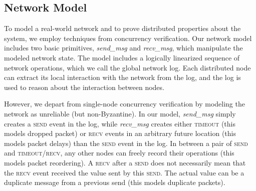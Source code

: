 
\subsection{Network Model}\label{subsec:network_modeling}
To model a real-world network and to prove distributed properties about the system, we employ techniques from concurrency verification. Our network model includes two basic primitives, \textit{send\_msg} and \textit{recv\_msg}, which manipulate the modeled network state. The model includes a logically linearized sequence of network operations, which we call the global network log. Each distributed node can extract its local interaction with the network from the log, and the log is used to reason about the interaction between nodes.

However, we depart from single-node concurrency verification by modeling the network as unreliable (but non-Byzantine). In our model, \textit{send\_msg} simply creates a \textsc{send} event in the log, while \textit{recv\_msg} creates either \textsc{timeout} (this models dropped packet) or \textsc{recv} events in an arbitrary future location (this models packet delays) than the \textsc{send} event in the log. In between a pair of \textsc{send} and \textsc{timeout/recv}, any other nodes can freely record their operations (this models packet reordering). A \textsc{recv} after a \textsc{send} does not necessarily mean that the \textsc{recv} event received the value sent by this \textsc{send}. The actual value can be a duplicate message from a previous send (this models duplicate packets).

